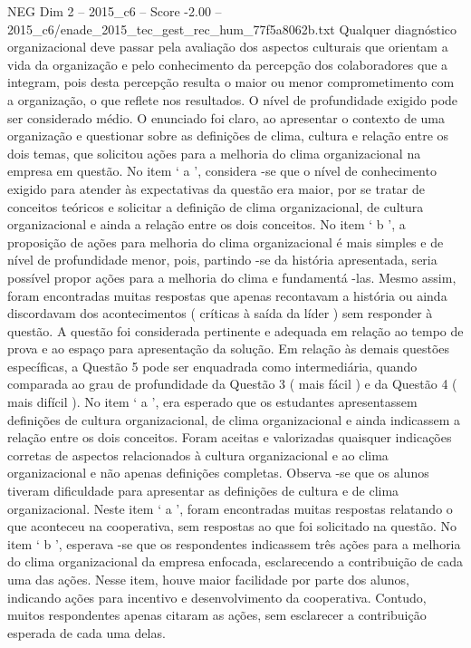 \begin{textsample}{NEG Dim 2 – 2015\_c6 – Score -2.00 – 2015\_c6/enade\_2015\_tec\_gest\_rec\_hum\_77f5a8062b.txt}
Qualquer diagnóstico organizacional deve passar pela avaliação dos aspectos culturais que orientam a vida da organização e pelo conhecimento da percepção dos colaboradores que a integram, pois desta percepção resulta o maior ou menor comprometimento com a organização, o que reflete nos resultados.
O nível de profundidade exigido pode ser considerado médio.
O enunciado foi claro, ao apresentar o contexto de uma organização e questionar sobre as definições de clima, cultura e relação entre os dois temas, que solicitou ações para a melhoria do clima organizacional na empresa em questão.
No item ‘ a ’, considera -se que o nível de conhecimento exigido para atender às expectativas da questão era maior, por se tratar de conceitos teóricos e solicitar a definição de clima organizacional, de cultura organizacional e ainda a relação entre os dois conceitos.
No item ‘ b ’, a proposição de ações para melhoria do clima organizacional é mais simples e de nível de profundidade menor, pois, partindo -se da história apresentada, seria possível propor ações para a melhoria do clima e fundamentá -las.
Mesmo assim, foram encontradas muitas respostas que apenas recontavam a história ou ainda discordavam dos acontecimentos ( críticas à saída da líder ) sem responder à questão.
A questão foi considerada pertinente e adequada em relação ao tempo de prova e ao espaço para apresentação da solução.
Em relação às demais questões específicas, a Questão 5 pode ser enquadrada como intermediária, quando comparada ao grau de profundidade da Questão 3 ( mais fácil ) e da Questão 4 ( mais difícil ).
No item ‘ a ’, era esperado que os estudantes apresentassem definições de cultura organizacional, de clima organizacional e ainda indicassem a relação entre os dois conceitos.
Foram aceitas e valorizadas quaisquer indicações corretas de aspectos relacionados à cultura organizacional e ao clima organizacional e não apenas definições completas.
Observa -se que os alunos tiveram dificuldade para apresentar as definições de cultura e de clima organizacional.
Neste item ‘ a ’, foram encontradas muitas respostas relatando o que aconteceu na cooperativa, sem respostas ao que foi solicitado na questão.
No item ‘ b ’, esperava -se que os respondentes indicassem três ações para a melhoria do clima organizacional da empresa enfocada, esclarecendo a contribuição de cada uma das ações.
Nesse item, houve maior facilidade por parte dos alunos, indicando ações para incentivo e desenvolvimento da cooperativa.
Contudo, muitos respondentes apenas citaram as ações, sem esclarecer a contribuição esperada de cada uma delas.

\end{textsample}
